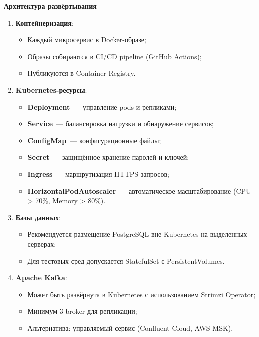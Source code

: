 \documentclass{bmstu}
\begin{document}
\begin{center}
    \textbf{Архитектура развёртывания}
\end{center}

\begin{enumerate}
    \item \textbf{Контейнеризация}:
    \begin{itemize}
        \item Каждый микросервис в Docker-образе;
        \item Образы собираются в CI/CD pipeline (GitHub Actions);
        \item Публикуются в Container Registry.
    \end{itemize}
    
    \item \textbf{Kubernetes-ресурсы}:
    \begin{itemize}
        \item \textbf{Deployment}~--- управление pods и репликами;
        \item \textbf{Service}~--- балансировка нагрузки и обнаружение сервисов;
        \item \textbf{ConfigMap}~--- конфигурационные файлы;
        \item \textbf{Secret}~--- защищённое хранение паролей и ключей;
        \item \textbf{Ingress}~--- маршрутизация HTTPS запросов;
        \item \textbf{HorizontalPodAutoscaler}~--- автоматическое масштабирование (CPU > 70\%, Memory > 80\%).
    \end{itemize}
    
    \item \textbf{Базы данных}:
    \begin{itemize}
        \item Рекомендуется размещение PostgreSQL вне Kubernetes на выделенных серверах;
        \item Для тестовых сред допускается StatefulSet с PersistentVolumes.
    \end{itemize}
    
    \item \textbf{Apache Kafka}:
    \begin{itemize}
        \item Может быть развёрнута в Kubernetes с использованием Strimzi Operator;
        \item Минимум 3 broker для репликации;
        \item Альтернатива: управляемый сервис (Confluent Cloud, AWS MSK).
    \end{itemize}
    

\end{enumerate}
\end{document}

